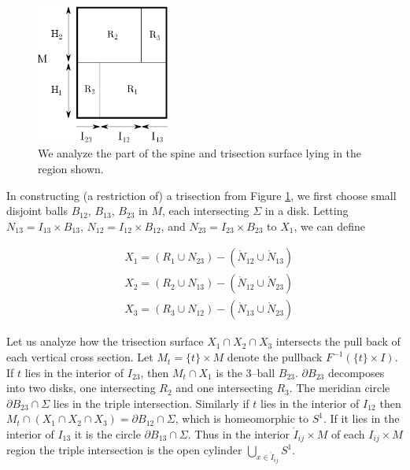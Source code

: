 \documentclass[12pt]{amsart}
\newcommand{\del}{\partial }
\theoremstyle{definition}
\theoremstyle{remark}
\begin{document}
\begin{figure}[h]
\centering
\includegraphics[height=1.8in]{MxS1_section.png}
\caption{We analyze the part of the spine and trisection surface lying in the region shown.}
\label{sectionbreakdown}
\end{figure}

In constructing (a restriction of) a trisection from Figure \ref{sectionbreakdown}, we first choose small disjoint balls $B_{12}$, $B_{13}$, $B_{23}$ in $M$, each intersecting $\Sigma$ in a disk.
Letting $N_{13} = I_{13} \times B_{13}$, $N_{12} = I_{12} \times B_{12}$, and $N_{23} = I_{23} \times B_{23}$ to $X_1$, we can define

\begin{align*}
&X_1 = (R_1 \cup N_{23}) - (\mathring N_{12} \cup \mathring N_{13}) \\
&X_2 = (R_2 \cup N_{13}) - (\mathring N_{12} \cup \mathring N_{23}) \\
&X_3 = (R_3 \cup N_{12}) - (\mathring N_{13} \cup \mathring N_{23})
\end{align*}

Let us analyze how the trisection surface $X_1 \cap X_2 \cap X_3$ intersects the pull back of each vertical cross section.
Let $M_t = \{t\} \times M$ denote the pullback $F^{-1}(\{t\} \times I)$.
If $t$ lies in the interior of $I_{23}$, then $M_t \cap X_1$ is the 3--ball $B_{23}$.
$\del B_{23}$ decomposes into two disks, one intersecting $R_2$ and one intersecting $R_3$.
The meridian circle $\del B_{23} \cap \Sigma$ lies in the triple intersection.
Similarly if $t$ lies in the interior of $I_{12}$ then $M_t \cap (X_1 \cap X_2 \cap X_3) = \del B_{12} \cap \Sigma$, which is homeomorphic to $S^1$.
If it lies in the interior of $I_{13}$ it is the circle $\del B_{13} \cap \Sigma$.
Thus in the interior $\mathring I_{ij} \times M$ of each $I_{ij} \times M$ region the triple intersection is the open cylinder $\bigcup_{x \in \mathring I_{ij}} S^1$.
\end{document}
